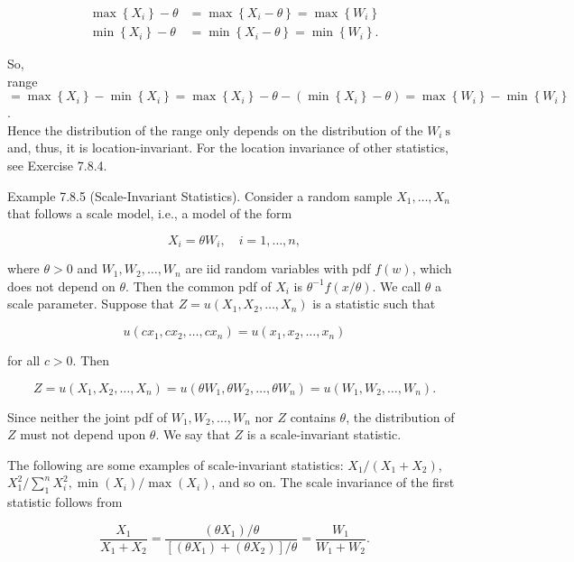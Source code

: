 $$
\begin{aligned}
\max \left\{X_{i}\right\}-\theta & =\max \left\{X_{i}-\theta\right\}=\max \left\{W_{i}\right\} \\
\min \left\{X_{i}\right\}-\theta & =\min \left\{X_{i}-\theta\right\}=\min \left\{W_{i}\right\} .
\end{aligned}
$$

So,\\
range $=\max \left\{X_{i}\right\}-\min \left\{X_{i}\right\}=\max \left\{X_{i}\right\}-\theta-\left(\min \left\{X_{i}\right\}-\theta\right)=\max \left\{W_{i}\right\}-\min \left\{W_{i}\right\}$.\\
Hence the distribution of the range only depends on the distribution of the $W_{i} \mathrm{~s}$ and, thus, it is location-invariant. For the location invariance of other statistics, see Exercise 7.8.4.

Example 7.8.5 (Scale-Invariant Statistics). Consider a random sample $X_{1}, \ldots, X_{n}$ that follows a scale model, i.e., a model of the form


\begin{equation*}
X_{i}=\theta W_{i}, \quad i=1, \ldots, n, \tag{7.8.4}
\end{equation*}


where $\theta>0$ and $W_{1}, W_{2}, \ldots, W_{n}$ are iid random variables with pdf $f(w)$, which does not depend on $\theta$. Then the common pdf of $X_{i}$ is $\theta^{-1} f(x / \theta)$. We call $\theta$ a scale parameter. Suppose that $Z=u\left(X_{1}, X_{2}, \ldots, X_{n}\right)$ is a statistic such that

$$
u\left(c x_{1}, c x_{2}, \ldots, c x_{n}\right)=u\left(x_{1}, x_{2}, \ldots, x_{n}\right)
$$

for all $c>0$. Then

$$
Z=u\left(X_{1}, X_{2}, \ldots, X_{n}\right)=u\left(\theta W_{1}, \theta W_{2}, \ldots, \theta W_{n}\right)=u\left(W_{1}, W_{2}, \ldots, W_{n}\right) .
$$

Since neither the joint pdf of $W_{1}, W_{2}, \ldots, W_{n}$ nor $Z$ contains $\theta$, the distribution of $Z$ must not depend upon $\theta$. We say that $Z$ is a scale-invariant statistic.

The following are some examples of scale-invariant statistics: $X_{1} /\left(X_{1}+X_{2}\right)$, $X_{1}^{2} / \sum_{1}^{n} X_{i}^{2}, \min \left(X_{i}\right) / \max \left(X_{i}\right)$, and so on. The scale invariance of the first statistic follows from

$$
\frac{X_{1}}{X_{1}+X_{2}}=\frac{\left(\theta X_{1}\right) / \theta}{\left[\left(\theta X_{1}\right)+\left(\theta X_{2}\right)\right] / \theta}=\frac{W_{1}}{W_{1}+W_{2}} .
$$

